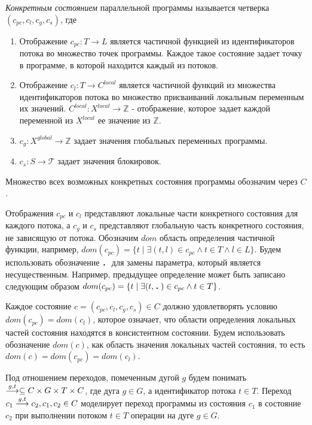 \emph{Конкретным состоянием} параллельной программы называется четверка $(c_{pc}, c_l, c_g, c_s)$, где
\begin{enumerate}
\item Отображение $c_{pc}: T \to L$ является частичной функцией из идентификаторов потока во множество точек программы.
Каждое такое состояние задает точку в программе, в которой находится каждый из потоков.
\item Отображение $c_l: T \to C^{local}$ является частичной функций из множества идентификаторов потока во множество присваиваний локальным переменным их значений. $C^{local}: X^{local} \to \mathbb{Z}$ - отображение, которое задает каждой переменной из $X^{local}$ ее значение из $\mathbb{Z}$.
\item $c_g: X^{global} \to \mathbb{Z}$ задает значения глобальных переменных программы.
\item $c_s: S \to \mathcal{T}$ задает значения блокировок. 
\end{enumerate}
Множество всех возможных конкретных состояния программы обозначим через $C$.

Отображения $c_{pc}$ и $c_l$ представляют локальные части конкретного состояния для каждого потока, а $c_g$ и $c_s$ представляют глобальную часть конкретного состояния, не зависящую от потока.
Обозначим $dom$ область определения частичной функции, например, $dom(c_{pc})=\{ t \mid \exists (t, l) \in c_{pc} \land t \in T \land l \in L \}$.
Будем использовать обозначение $\qdot$ для замены параметра, который является несущественным.
Например, предыдущее определение может быть записано следующим образом $dom(c_{pc})=\{ t \mid \exists (t, \qdot) \in c_{pc} \land t \in T\}$.

Каждое состояние $c=(c_{pc}, c_l, c_g, c_s)\in C$ должно удовлетворять условию $dom(c_{pc})=dom(c_l)$, которое означает, что области определения локальных частей состояния находятся в консистентном состоянии.
Будем использовать обозначение $dom(c)$, как область значения локальных частей состояния, то есть $dom(c)=dom(c_{pc})=dom(c_l)$.

Под отношением переходов, помеченным дугой $g$ будем понимать $\stackrel{g,t}{\longrightarrow} \subseteq C \times G \times T \times C$, где дуга $g \in G$, а идентификатор потока $t \in T$.
Переход  $c_1 \stackrel{g,t}{\longrightarrow} c_2, c_1, c_2 \in C$ моделирует переход программы из состояния $c_1$ в состояние $c_2$ при выполнении потоком $t \in T$ операции на дуге $g \in G$.

